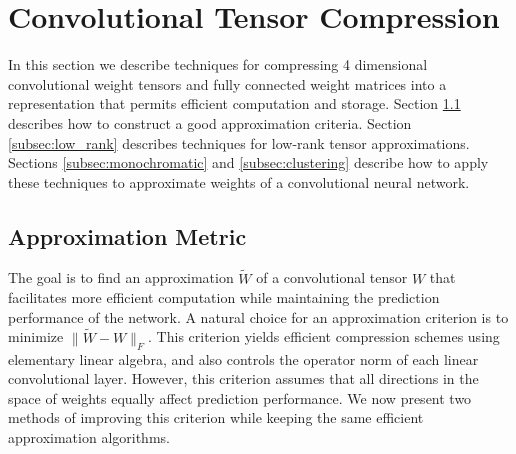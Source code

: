 
\section{Convolutional Tensor Compression}\label{sec:approx_tech}
In this section we describe
techniques for compressing 
4 dimensional convolutional weight tensors and fully connected weight matrices into a representation that permits
efficient computation and storage. 
Section \ref{reconstr_sect} describes how to construct a good approximation 
criteria. Section \ref{subsec:low_rank} describes techniques for low-rank tensor
approximations. Sections \ref{subsec:monochromatic} and \ref{subsec:clustering} describe how to 
apply these techniques to approximate weights of a convolutional neural network.





\subsection{Approximation Metric}
\label{reconstr_sect}

The goal is to find an approximation $\tilde{W}$ of a convolutional tensor $W$ 
that facilitates more efficient computation while maintaining the prediction performance of the network.
A natural choice for an approximation criterion is
to minimize $\| \tilde{W} - W \|_F$. This criterion yields 
efficient compression schemes using elementary linear algebra, and also controls
the operator norm of each linear convolutional layer.
%
However, this criterion assumes that all directions in the space of weights equally 
affect prediction performance. We now present two methods of improving this criterion while 
keeping the same efficient approximation algorithms.

